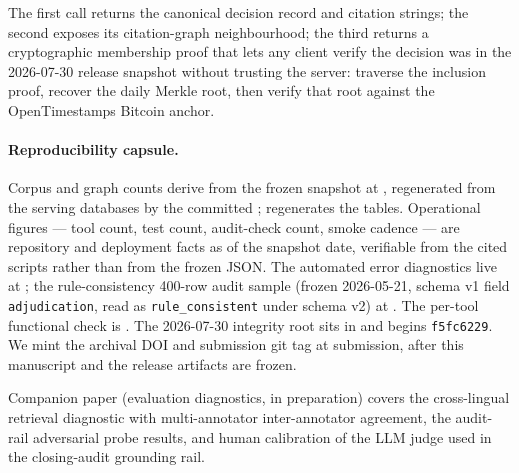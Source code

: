 \documentclass[11pt,a4paper]{article}
\begin{document}
\noindent The first call returns the canonical decision record and citation strings; the second exposes its citation-graph neighbourhood; the third returns a cryptographic membership proof that lets any client verify the decision was in the 2026-07-30 release snapshot without trusting the server: traverse the inclusion proof, recover the daily Merkle root, then verify that root against the OpenTimestamps Bitcoin anchor.

\paragraph{Reproducibility capsule.} Corpus and graph counts derive from the frozen snapshot at , regenerated from the serving databases by the committed ;  regenerates the tables. Operational figures --- tool count, test count, audit-check count, smoke cadence --- are repository and deployment facts as of the snapshot date, verifiable from the cited scripts rather than from the frozen JSON. The automated error diagnostics live at ; the rule-consistency 400-row audit sample (frozen 2026-05-21, schema v1 field \texttt{adjudication}, read as \texttt{rule\_consistent} under schema v2) at . The per-tool functional check is . The 2026-07-30 integrity root sits in  and begins \texttt{f5fc6229}. We mint the archival DOI and submission git tag at submission, after this manuscript and the release artifacts are frozen.

Companion paper (evaluation diagnostics, in preparation) covers the cross-lingual retrieval diagnostic with multi-annotator inter-annotator agreement, the audit-rail adversarial probe results, and human calibration of the LLM judge used in the closing-audit grounding rail.



\end{document}
